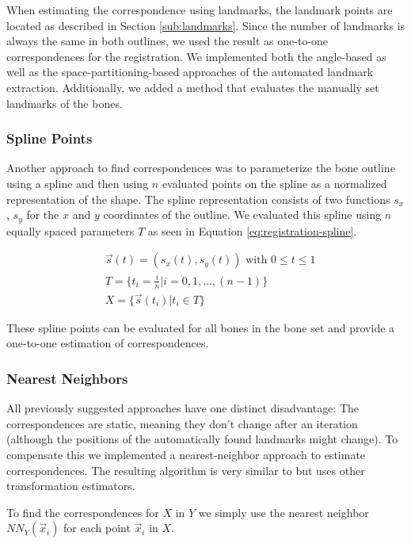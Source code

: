 \documentclass[pdftex,12pt,a4paper]{report}
\begin{document}
When estimating the correspondence using landmarks, the landmark points are located as described in Section
\ref{sub:landmarks}. Since the number of landmarks is always the same in both outlines, we used the result
as one-to-one correspondences for the registration. We implemented both the angle-based as well as the
space-partitioning-based approaches of the automated landmark extraction. Additionally, we added a method
that evaluates the manually set landmarks of the bones.

\subsubsection{Spline Points}

Another approach to find correspondences was to parameterize the bone outline using a spline and then using $n$
evaluated points on the spline as a normalized representation of the shape. The spline representation consists
of two functions $s_x$, $s_y$ for the $x$ and $y$ coordinates of the outline. We evaluated this spline using $n$
equally spaced parameters $T$ as seen in Equation \ref{eq:registration-spline}.

\begin{equation}
\label{eq:registration-spline}
\begin{split}
& \vec{s}(t) = ( s_x(t), s_y(t) ) \text{ with } 0 \leq t \leq 1 \\
& T = \{ t_i=\frac{i}{n} | i=0, 1, \dots, (n-1) \} \\
& X = \{ \vec{s}(t_i) | t_i \in T \}
\end{split}
\end{equation}

These spline points can be evaluated for all bones in the bone set and provide a one-to-one estimation of correspondences.

\subsubsection{Nearest Neighbors}

All previously suggested approaches have one distinct disadvantage: The correspondences are static, meaning they don't
change after an iteration (although the positions of the automatically found landmarks might change). To compensate this
we implemented a nearest-neighbor approach to estimate correspondences. The resulting algorithm is very similar to
\cite{besl1992method} but uses other transformation estimators.

To find the correspondences for $X$ in $Y$ we simply use the nearest neighbor $NN_Y(\vec{x}_i)$ for each point $\vec{x}_i$ in $X$.
\end{document}
